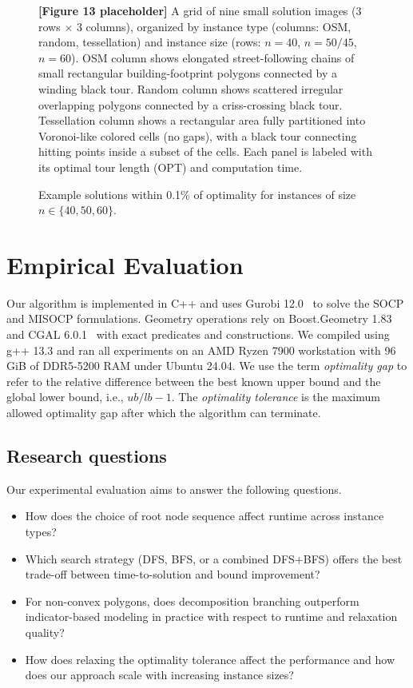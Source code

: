 \documentclass[11pt,a4paper]{article}
\theoremstyle{plain}
\begin{document}
\begin{figure}[h]
\centering
\begin{figplaceholder}
\textbf{[Figure 13 placeholder]} A grid of nine small solution images (3 rows $\times$ 3 columns), organized by instance type (columns: OSM, random, tessellation) and instance size (rows: $n=40$, $n=50/45$, $n=60$). OSM column shows elongated street-following chains of small rectangular building-footprint polygons connected by a winding black tour. Random column shows scattered irregular overlapping polygons connected by a criss-crossing black tour. Tessellation column shows a rectangular area fully partitioned into Voronoi-like colored cells (no gaps), with a black tour connecting hitting points inside a subset of the cells. Each panel is labeled with its optimal tour length (OPT) and computation time.
\end{figplaceholder}
\caption{Example solutions within 0.1\% of optimality for instances of size $n \in \{40, 50, 60\}$.}
\label{fig:13}
\end{figure}

\section{Empirical Evaluation}

Our algorithm is implemented in C++ and uses Gurobi 12.0~\cite{ref31} to solve the SOCP and MISOCP formulations. Geometry operations rely on Boost.Geometry 1.83~\cite{ref28} and CGAL 6.0.1~\cite{ref43} with exact predicates and constructions. We compiled using g++ 13.3 and ran all experiments on an AMD Ryzen 7900 workstation with 96\,GiB of DDR5-5200 RAM under Ubuntu 24.04. We use the term \emph{optimality gap} to refer to the relative difference between the best known upper bound and the global lower bound, i.e., $ub/lb - 1$. The \emph{optimality tolerance} is the maximum allowed optimality gap after which the algorithm can terminate.

\subsection{Research questions}

Our experimental evaluation aims to answer the following questions.

\begin{itemize}[leftmargin=2.2em]
	\item[\textbf{Q1}] How does the choice of root node sequence affect runtime across instance types?
	\item[\textbf{Q2}] Which search strategy (DFS, BFS, or a combined DFS+BFS) offers the best trade-off between time-to-solution and bound improvement?
	\item[\textbf{Q3}] For non-convex polygons, does decomposition branching outperform indicator-based modeling in practice with respect to runtime and relaxation quality?
	\item[\textbf{Q4}] How does relaxing the optimality tolerance affect the performance and how does our approach scale with increasing instance sizes?
\end{itemize}
\end{document}
